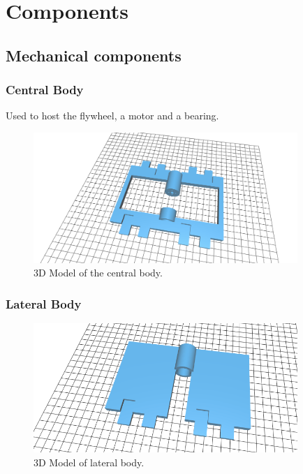 \section{Components}

\subsection{Mechanical components}
\subsubsection{Central Body}

Used to host the flywheel, a motor and a bearing.
\begin{figure}[H]
    \centering
    \includegraphics[width=10cm]{img/components/central_body.png}
    \caption{3D Model of the central body.}
    \label{fig:Mass plot}
\end{figure}
\subsubsection{Lateral Body}
\begin{figure}[H]
    \centering
    \includegraphics[width=10cm]{img/components/lateral_body.png}
    \caption{3D Model of lateral body.}
    \label{fig:Mass plot}
\end{figure}
